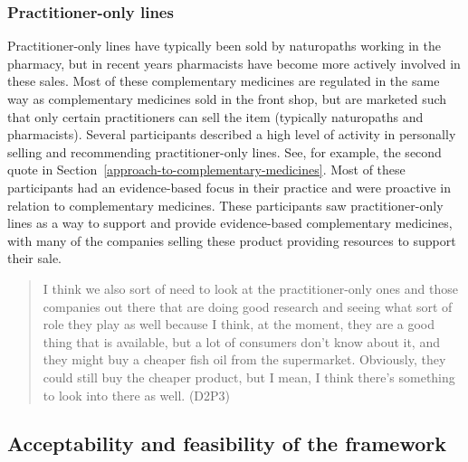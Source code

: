 \documentclass[11pt,a4paper]{article}
\begin{document}
\subsubsection{Practitioner-only lines}\label{practitioner-only-lines}

Practitioner-only lines have typically been sold by naturopaths working
in the pharmacy, but in recent years pharmacists have become more
actively involved in these sales. Most of these complementary medicines
are regulated in the same way as complementary medicines sold in the
front shop, but are marketed such that only certain practitioners can
sell the item (typically naturopaths and pharmacists). Several
participants described a high level of activity in personally selling
and recommending practitioner-only lines. See, for example, the second
quote in Section~\ref{approach-to-complementary-medicines}. Most of
these participants had an evidence-based focus in their practice and
were proactive in relation to complementary medicines. These
participants saw practitioner-only lines as a way to support and provide
evidence-based complementary medicines, with many of the companies
selling these product providing resources to support their sale.

\begin{quote}
I think we also sort of need to look at the practitioner-only ones and
those companies out there that are doing good research and seeing what
sort of role they play as well because I think, at the moment, they are
a good thing that is available, but a lot of consumers don't know about
it, and they might buy a cheaper fish oil from the supermarket.
Obviously, they could still buy the cheaper product, but I mean, I think
there's something to look into there as well. (D2P3)
\end{quote}

\subsection{Acceptability and feasibility of the
framework}\label{acceptability-and-feasibility-of-the-framework}
\end{document}
